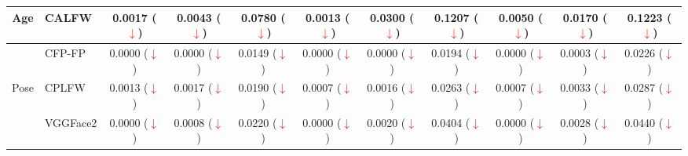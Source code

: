 \documentclass[class=report, crop=false, a4paper, 12pt]{standalone}
\begin{document}
\begin{table}[H]
{\begin{tabular}{cl|ccc|ccc|ccc|}
    \multicolumn{1}{|c|}{\multirow{-2}{*}{Age}}     & CALFW    & \multicolumn{1}{c|}{{\color[HTML]{333333} 0.0017 (\textcolor{red}{$\downarrow$})}} & \multicolumn{1}{c|}{{\color[HTML]{333333} 0.0043 (\textcolor{red}{$\downarrow$})}} & {\color[HTML]{333333} 0.0780 (\textcolor{red}{$\downarrow$})} & \multicolumn{1}{c|}{0.0013 (\textcolor{red}{$\downarrow$})} & \multicolumn{1}{c|}{0.0300 (\textcolor{red}{$\downarrow$})} & 0.1207 (\textcolor{red}{$\downarrow$}) & \multicolumn{1}{c|}{0.0050 (\textcolor{red}{$\downarrow$})} & \multicolumn{1}{c|}{0.0170 (\textcolor{red}{$\downarrow$})} & 0.1223 (\textcolor{red}{$\downarrow$}) \\ \hline
    \multicolumn{1}{|c|}{}                          & CFP-FP   & \multicolumn{1}{c|}{{\color[HTML]{333333} 0.0000 (\textcolor{red}{$\downarrow$})}} & \multicolumn{1}{c|}{{\color[HTML]{333333} 0.0000 (\textcolor{red}{$\downarrow$})}} & {\color[HTML]{333333} 0.0149 (\textcolor{red}{$\downarrow$})} & \multicolumn{1}{c|}{0.0000 (\textcolor{red}{$\downarrow$})} & \multicolumn{1}{c|}{0.0000 (\textcolor{red}{$\downarrow$})} & 0.0194 (\textcolor{red}{$\downarrow$}) & \multicolumn{1}{c|}{0.0000 (\textcolor{red}{$\downarrow$})} & \multicolumn{1}{c|}{0.0003 (\textcolor{red}{$\downarrow$})} & 0.0226 (\textcolor{red}{$\downarrow$}) \\ \cline{2-11} 
    \multicolumn{1}{|c|}{\multirow{-2}{*}{Pose}}    & CPLFW    & \multicolumn{1}{c|}{{\color[HTML]{333333} 0.0013 (\textcolor{red}{$\downarrow$})}} & \multicolumn{1}{c|}{{\color[HTML]{333333} 0.0017 (\textcolor{red}{$\downarrow$})}} & {\color[HTML]{333333} 0.0190 (\textcolor{red}{$\downarrow$})} & \multicolumn{1}{c|}{0.0007 (\textcolor{red}{$\downarrow$})} & \multicolumn{1}{c|}{0.0016 (\textcolor{red}{$\downarrow$})} & 0.0263 (\textcolor{red}{$\downarrow$}) & \multicolumn{1}{c|}{0.0007 (\textcolor{red}{$\downarrow$})} & \multicolumn{1}{c|}{0.0033 (\textcolor{red}{$\downarrow$})} & 0.0287 (\textcolor{red}{$\downarrow$}) \\ \hline
    \multicolumn{1}{|c|}{}                          & VGGFace2 & \multicolumn{1}{c|}{{\color[HTML]{333333} 0.0000 (\textcolor{red}{$\downarrow$})}} & \multicolumn{1}{c|}{{\color[HTML]{333333} 0.0008 (\textcolor{red}{$\downarrow$})}} & {\color[HTML]{333333} 0.0220 (\textcolor{red}{$\downarrow$})} & \multicolumn{1}{c|}{0.0000 (\textcolor{red}{$\downarrow$})} & \multicolumn{1}{c|}{0.0020 (\textcolor{red}{$\downarrow$})} & 0.0404 (\textcolor{red}{$\downarrow$}) & \multicolumn{1}{c|}{0.0000 (\textcolor{red}{$\downarrow$})} & \multicolumn{1}{c|}{0.0028 (\textcolor{red}{$\downarrow$})} & 0.0440 (\textcolor{red}{$\downarrow$}) \\ \cline{2-11} 

\end{tabular}}
\end{table}
\end{document}
